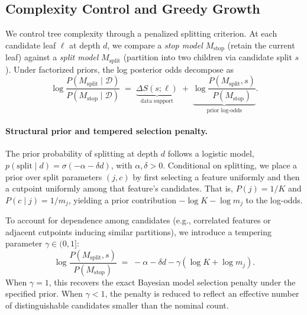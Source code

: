 \documentclass[twoside,11pt]{article}
\begin{document}
\subsection{Complexity Control and Greedy Growth}\label{subsec:complexity_growth}

We control tree complexity through a penalized splitting criterion. At each candidate leaf $\ell$ at depth $d$, we compare a \emph{stop model} $M_{\mathrm{stop}}$ (retain the current leaf) against a \emph{split model} $M_{\mathrm{split}}$ (partition into two children via candidate split $s$). Under factorized priors, the log posterior odds decompose as
\begin{equation}\label{eq:posterior_odds}
\log \frac{P(M_{\mathrm{split}} \mid \mathcal{D})}{P(M_{\mathrm{stop}} \mid \mathcal{D})}
\;=\;
\underbrace{\Delta S(s;\ell)}_{\text{data support}}
\;+\;
\underbrace{\log \frac{P(M_{\mathrm{split}}, s)}{P(M_{\mathrm{stop}})}}_{\text{prior log-odds}}.
\end{equation}

\paragraph{Structural prior and tempered selection penalty.}
The prior probability of splitting at depth $d$ follows a logistic model, $p(\mathrm{split} \mid d) = \sigma(-\alpha - \delta d)$, with $\alpha, \delta > 0$.
Conditional on splitting, we place a prior over split parameters $(j,c)$ by first selecting a feature uniformly and then a cutpoint uniformly among that feature's candidates. That is, $P(j) = 1/K$ and $P(c \mid j) = 1/m_j$, yielding a prior contribution $-\log K - \log m_j$ to the log-odds.

To account for dependence among candidates (e.g., correlated features or adjacent cutpoints inducing similar partitions), we introduce a tempering parameter $\gamma \in (0,1]$:
\begin{equation}\label{eq:prior_logodds_fixed}
\log \frac{P(M_{\mathrm{split}}, s)}{P(M_{\mathrm{stop}})}
\;=\;
-\alpha - \delta d - \gamma(\log K + \log m_j).
\end{equation}
When $\gamma = 1$, this recovers the exact Bayesian model selection penalty under the specified prior. When $\gamma < 1$, the penalty is reduced to reflect an effective number of distinguishable candidates smaller than the nominal count.
\end{document}
